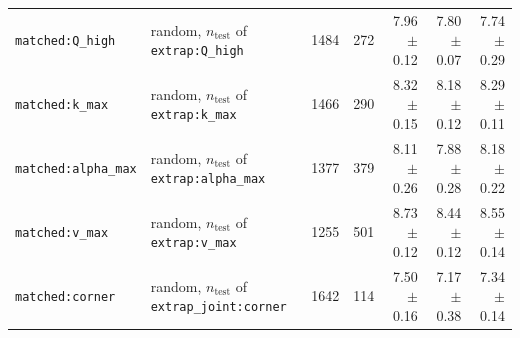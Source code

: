 \begin{table}[htbp]
\begin{tabular}{@{}llrrrrr@{}}
\addlinespace
\texttt{matched:Q\_high} & random, $n_\mathrm{test}$ of \texttt{extrap:Q\_high} & 1484 & 272 & 7.96 $\pm$ 0.12 & 7.80 $\pm$ 0.07 & 7.74 $\pm$ 0.29 \\
\texttt{matched:k\_max} & random, $n_\mathrm{test}$ of \texttt{extrap:k\_max} & 1466 & 290 & 8.32 $\pm$ 0.15 & 8.18 $\pm$ 0.12 & 8.29 $\pm$ 0.11 \\
\texttt{matched:alpha\_max} & random, $n_\mathrm{test}$ of \texttt{extrap:alpha\_max} & 1377 & 379 & 8.11 $\pm$ 0.26 & 7.88 $\pm$ 0.28 & 8.18 $\pm$ 0.22 \\
\texttt{matched:v\_max} & random, $n_\mathrm{test}$ of \texttt{extrap:v\_max} & 1255 & 501 & 8.73 $\pm$ 0.12 & 8.44 $\pm$ 0.12 & 8.55 $\pm$ 0.14 \\
\texttt{matched:corner} & random, $n_\mathrm{test}$ of \texttt{extrap\_joint:corner} & 1642 & 114 & 7.50 $\pm$ 0.16 & 7.17 $\pm$ 0.38 & 7.34 $\pm$ 0.14 \\
\bottomrule
\end{tabular}
\end{table}
